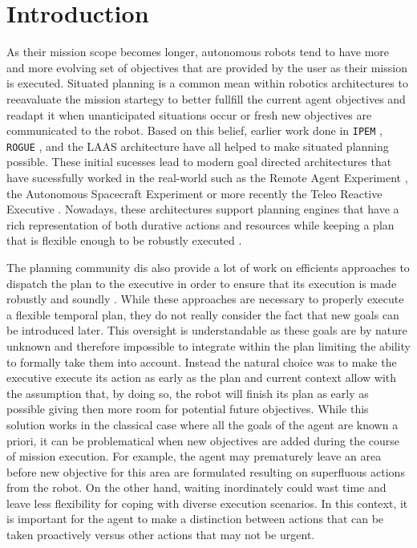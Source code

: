 
\section{Introduction}
\label{sec:intro}

As their mission scope becomes longer, autonomous robots tend to have
more and more evolving set of objectives that are provided by the user
as their mission is executed. Situated planning is a common mean
within robotics architectures to reeavaluate the mission startegy to
better fullfill the current agent objectives and readapt it when
unanticipated situations occur or fresh new objectives are
communicated to the robot. Based on this belief, earlier work done in
\texttt{IPEM} \cite{AmbrosIngerson88}, \texttt{ROGUE} \cite{Haigh98},
and the LAAS architecture \cite{alami:1998p820} have all helped to
make situated planning possible. These initial sucesses lead to modern
goal directed architectures that have sucessfully worked in the
real-world such as the Remote Agent Experiment \cite{mus98}, the
Autonomous Spacecraft Experiment \cite{chien99} or more recently the
Teleo Reactive Executive \cite{mcgann08b,py10}. Nowadays, these
architectures support planning engines that have a rich representation
of both durative actions and resources while keeping a plan that is
flexible enough to be robustly executed \cite{lemai04}.

The planning community dis also provide a lot of work on efficients
approaches to dispatch the plan to the executive in order to ensure
that its execution is made robustly and soundly
\cite{mus98a,morris01}. While these approaches  are necessary to
properly execute a flexible temporal plan, they do not really
consider the fact that new goals can be introduced later. This
oversight is understandable as these goals are by nature unknown and
therefore impossible to integrate within the plan limiting the ability
to formally take them into account. Instead the natural choice was to
make the executive execute its action as early as the plan and
current context allow with the assumption that, by doing so, the
robot will finish its plan as early as possible giving then more room
for potential future objectives.  While
this solution works in the classical case where all the goals of the
agent are known a priori, it can be problematical when new objectives
are added during the course of mission execution. For example, the
agent may prematurely leave an area before new objective for this area
are formulated resulting on superfluous actions from the robot. On the 
other hand, waiting inordinately could wast time and leave less
flexibility  for coping with diverse execution scenarios. In this
context,  it is important for the agent to make a  distinction between 
actions that can be taken proactively versus other actions that may
not  be urgent.  

